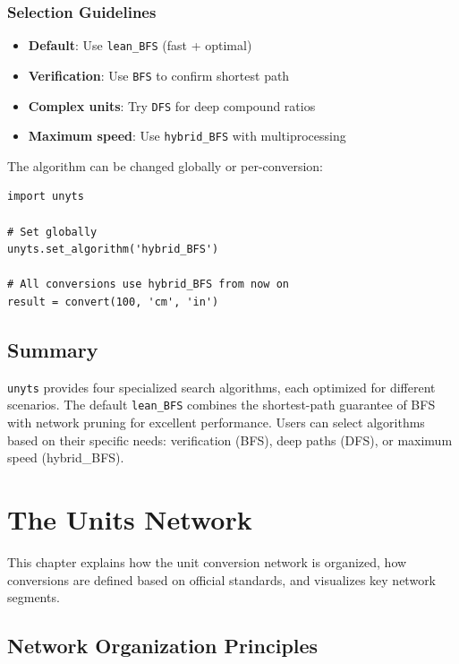 \documentclass[11pt,a4paper]{report}
\begin{document}
\subsection{Selection Guidelines}

\begin{itemize}[leftmargin=*]
  \item \textbf{Default}: Use \texttt{lean\_BFS} (fast + optimal)
  \item \textbf{Verification}: Use \texttt{BFS} to confirm shortest path
  \item \textbf{Complex units}: Try \texttt{DFS} for deep compound ratios
  \item \textbf{Maximum speed}: Use \texttt{hybrid\_BFS} with multiprocessing
\end{itemize}

The algorithm can be changed globally or per-conversion:

\begin{lstlisting}[style=pythonstyle]
import unyts

# Set globally
unyts.set_algorithm('hybrid_BFS')

# All conversions use hybrid_BFS from now on
result = convert(100, 'cm', 'in')
\end{lstlisting}

\section{Summary}

\texttt{unyts} provides four specialized search algorithms, each optimized for different scenarios. The default \texttt{lean\_BFS} combines the shortest-path guarantee of BFS with network pruning for excellent performance. Users can select algorithms based on their specific needs: verification (BFS), deep paths (DFS), or maximum speed (hybrid\_BFS).


\chapter{The Units Network}

This chapter explains how the unit conversion network is organized, how conversions are defined based on official standards, and visualizes key network segments.

\section{Network Organization Principles}
\end{document}

